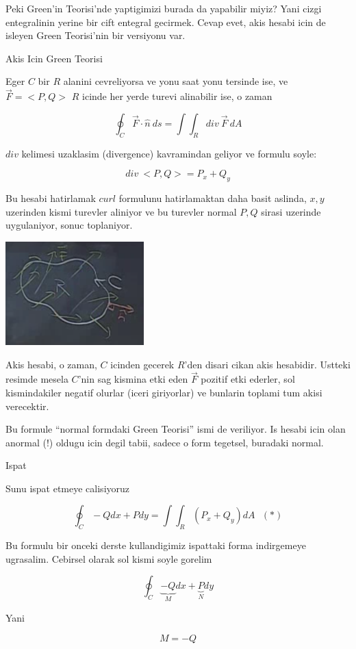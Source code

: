 \documentclass[12pt,fleqn]{article}
\begin{document}
Peki Green'in Teorisi'nde yaptigimizi burada da yapabilir miyiz? Yani cizgi
entegralinin yerine bir cift entegral gecirmek. Cevap evet, akis hesabi
icin de isleyen Green Teorisi'nin bir versiyonu var. 

Akis Icin Green Teorisi

Eger $C$ bir $R$ alanini cevreliyorsa ve yonu saat yonu tersinde ise, ve
$\vec{F}=<P,Q>$ $R$ icinde her yerde turevi alinabilir ise, o zaman 

\[ \oint_C \vec{F} \cdot \hat{n} \ ds = 
\int \int_R div \ \vec{F} \ dA
\]

$div$ kelimesi uzaklasim (divergence) kavramindan geliyor ve formulu soyle:

\[ div \ <P,Q> = P_x + Q_y \]

Bu hesabi hatirlamak $curl$ formulunu hatirlamaktan daha basit aslinda,
$x,y$ uzerinden kismi turevler aliniyor ve bu turevler normal $P,Q$ sirasi
uzerinde uygulaniyor, sonuc toplaniyor. 

\includegraphics[height=4cm]{23_8.png}

Akis hesabi, o zaman, $C$ icinden gecerek $R$'den disari cikan akis
hesabidir. Ustteki resimde mesela $C$'nin sag kismina etki eden $\vec{F}$
pozitif etki ederler, sol kismindakiler negatif olurlar (iceri giriyorlar)
ve bunlarin toplami tum akisi verecektir. 

Bu formule ``normal formdaki Green Teorisi'' ismi de veriliyor. Is hesabi
icin olan anormal (!) oldugu icin degil tabii, sadece o form tegetsel,
buradaki normal. 

Ispat

Sunu ispat etmeye calisiyoruz

\[ \oint_C -Qdx + Pdy = \int \int_R (P_x + Q_y) dA 
\ \ \ (*)
\]

Bu formulu bir onceki derste kullandigimiz ispattaki forma indirgemeye
ugrasalim. Cebirsel olarak sol kismi soyle gorelim

\[ \oint_C 
\underbrace{-Q}_{M}dx + 
\underbrace{P}_{N}dy 
\]

Yani 

\[ M = -Q \]
\end{document}
